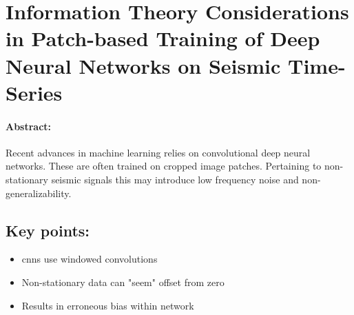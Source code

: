 \section{Information Theory Considerations in Patch-based Training of Deep Neural Networks on Seismic Time-Series}

\paragraph{Abstract:} Recent advances in machine learning relies on convolutional deep neural networks. These are often trained on cropped image patches. Pertaining to non-stationary seismic signals this may introduce low frequency noise and non-generalizability.

\subsection*{Key points:}
\begin{itemize}
    \item \aclp{cnn} use windowed convolutions
    \item Non-stationary data can "seem" offset from zero
    \item Results in erroneous bias within network
\end{itemize}

{\vfill\hfill\newline{}}


